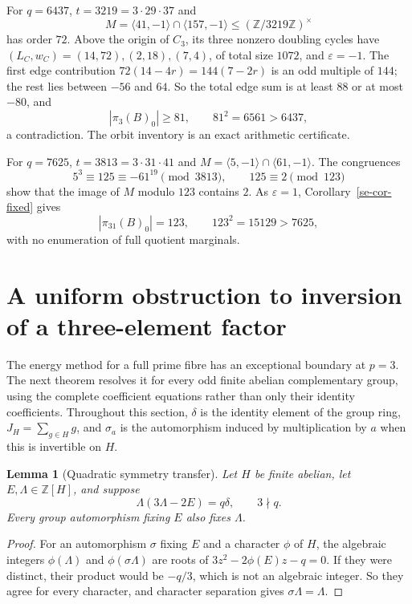 \documentclass[11pt]{article}
\newtheorem{lemma}[theorem]{Lemma}
\theoremstyle{definition}
\theoremstyle{remark}
\begin{document}
For $q=6437$, $t=3219=3\cdot29\cdot37$ and
\[
 M=\langle41,-1\rangle\cap\langle157,-1\rangle
       \le (\mathbb Z/3219\mathbb Z)^\times
\]
has order $72$.  Above the origin of $C_3$, its three nonzero doubling
cycles have $(L_C,w_C)=(14,72),(2,18),(7,4)$, of total size $1072$, and
$\varepsilon=-1$.  The first edge contribution
$72(14-4r)=144(7-2r)$ is an odd multiple of $144$; the rest lies between
$-56$ and $64$.  So the total edge sum is at least $88$ or at most
$-80$, and
\[
 |\pi_3(B)_0|\ge81,\qquad 81^2=6561>6437,
\]
a contradiction.  The orbit inventory is an exact arithmetic
certificate.

For $q=7625$, $t=3813=3\cdot31\cdot41$ and
$M=\langle5,-1\rangle\cap\langle61,-1\rangle$.
The congruences
\[
 5^3\equiv125\equiv-61^{19}\pmod{3813},
 \qquad125\equiv2\pmod{123}
\]
show that the image of $M$ modulo $123$ contains $2$.
As $\varepsilon=1$, Corollary~\ref{se-cor-fixed} gives
\[
 |\pi_{31}(B)_0|=123,
 \qquad123^2=15129>7625,
\]
with no enumeration of full quotient marginals.

\section{A uniform obstruction to inversion of a three-element factor}
\label{se-sec-three}

The energy method for a full prime fibre has an exceptional boundary at
$p=3$.  The next theorem resolves it for every odd finite abelian
complementary group, using the complete coefficient equations rather
than only their identity coefficients.  Throughout this section, $\delta$ is the identity element of the group
ring, $J_H=\sum_{g\in H}g$, and $\sigma_a$ is the automorphism induced
by multiplication by $a$ when this is invertible on $H$.

\begin{lemma}[Quadratic symmetry transfer]
\label{se-lem-transfer}
Let $H$ be finite abelian, let $E,\Lambda\in\mathbb Z[H]$, and suppose
\[
 \Lambda(3\Lambda-2E)=q\delta,\qquad 3\nmid q.
\]
Every group automorphism fixing $E$ also fixes $\Lambda$.
\end{lemma}

\begin{proof}
For an automorphism $\sigma$ fixing $E$ and a character $\phi$ of $H$,
the algebraic integers $\phi(\Lambda)$ and $\phi(\sigma\Lambda)$ are
roots of $3z^2-2\phi(E)z-q=0$.  If they were distinct, their product
would be $-q/3$, which is not an algebraic integer.  So they agree for
every character, and character separation gives $\sigma\Lambda=\Lambda$.
\end{proof}
\end{document}
